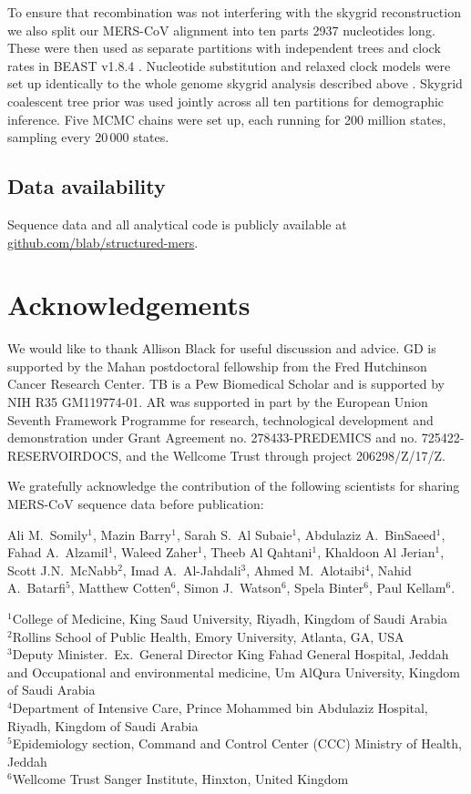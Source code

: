 \documentclass[11pt,oneside,letterpaper]{article}
\begin{document}
To ensure that recombination was not interfering with the skygrid reconstruction we also split our MERS-CoV alignment into ten parts 2937 nucleotides long.
These were then used as separate partitions with independent trees and clock rates in BEAST v1.8.4 \citep{drummond_bayesian_2012}.
Nucleotide substitution and relaxed clock models were set up identically to the whole genome skygrid analysis described above \citep{drummond_2006,hky_1985,yang_1994}.
Skygrid coalescent tree prior \citep{gill_2013} was used jointly across all ten partitions for demographic inference.
Five MCMC chains were set up, each running for 200 million states, sampling every $20\,000$ states.


\subsection*{Data availability}
Sequence data and all analytical code is publicly available at \href{https://github.com/blab/structured-mers}{github.com/blab/structured-mers}.

\section*{Acknowledgements}
We would like to thank Allison Black for useful discussion and advice.
GD is supported by the Mahan postdoctoral fellowship from the Fred Hutchinson Cancer Research Center.
TB is a Pew Biomedical Scholar and is supported by NIH R35 GM119774-01.
AR was supported in part by the European Union Seventh Framework Programme for research, technological development and demonstration under Grant Agreement no. 278433-PREDEMICS and no. 725422-RESERVOIRDOCS, and the Wellcome Trust through project 206298/Z/17/Z.

We gratefully acknowledge the contribution of the following scientists for sharing MERS-CoV sequence data before publication:

Ali M.\ Somily$^{1}$, Mazin Barry$^{1}$, Sarah S.\ Al Subaie$^{1}$, Abdulaziz A.\ BinSaeed$^{1}$, Fahad A.\ Alzamil$^{1}$, Waleed Zaher$^{1}$, Theeb Al Qahtani$^{1}$, Khaldoon Al Jerian$^{1}$, Scott J.N.\ McNabb$^{2}$, Imad A.\ Al-Jahdali$^{3}$, Ahmed M.\ Alotaibi$^{4}$, Nahid A.\ Batarfi$^{5}$, Matthew Cotten$^{6}$, Simon J.\ Watson$^{6}$, Spela Binter$^{6}$, Paul Kellam$^{6}$.


$^{1}$College of Medicine, King Saud University, Riyadh, Kingdom of Saudi Arabia \\
$^{2}$Rollins School of Public Health, Emory University, Atlanta, GA, USA \\
$^{3}$Deputy Minister.\ Ex.\ General Director King Fahad General Hospital, Jeddah and Occupational and environmental medicine, Um AlQura University, Kingdom of Saudi Arabia \\
$^{4}$Department of Intensive Care, Prince Mohammed bin Abdulaziz Hospital, Riyadh, Kingdom of Saudi Arabia \\
$^{5}$Epidemiology section, Command and Control Center (CCC) Ministry of Health, Jeddah \\
$^{6}$Wellcome Trust Sanger Institute, Hinxton, United Kingdom \\
\end{document}
